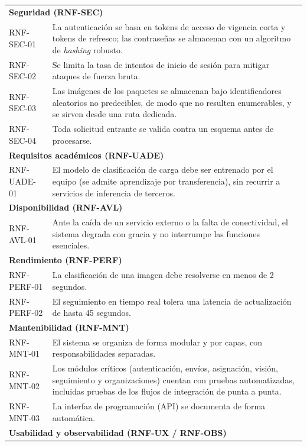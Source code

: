 {\begin{longtable}{p{2.6cm}p{11cm}}
    \multicolumn{2}{l}{\textbf{Seguridad (RNF-SEC)}} \\
    RNF-SEC-01 & La autenticación se basa en tokens de acceso de vigencia corta y tokens de refresco; las contraseñas se almacenan con un algoritmo de \emph{hashing} robusto. \\
    RNF-SEC-02 & Se limita la tasa de intentos de inicio de sesión para mitigar ataques de fuerza bruta. \\
    RNF-SEC-03 & Las imágenes de los paquetes se almacenan bajo identificadores aleatorios no predecibles, de modo que no resulten enumerables, y se sirven desde una ruta dedicada. \\
    RNF-SEC-04 & Toda solicitud entrante se valida contra un esquema antes de procesarse. \\
    \midrule
    \multicolumn{2}{l}{\textbf{Requisitos académicos (RNF-UADE)}} \\
    RNF-UADE-01 & El modelo de clasificación de carga debe ser entrenado por el equipo (se admite aprendizaje por transferencia), sin recurrir a servicios de inferencia de terceros. \\
    \midrule
    \multicolumn{2}{l}{\textbf{Disponibilidad (RNF-AVL)}} \\
    RNF-AVL-01 & Ante la caída de un servicio externo o la falta de conectividad, el sistema degrada con gracia y no interrumpe las funciones esenciales. \\
    \midrule
    \multicolumn{2}{l}{\textbf{Rendimiento (RNF-PERF)}} \\
    RNF-PERF-01 & La clasificación de una imagen debe resolverse en menos de 2 segundos. \\
    RNF-PERF-02 & El seguimiento en tiempo real tolera una latencia de actualización de hasta 45 segundos. \\
    \midrule
    \multicolumn{2}{l}{\textbf{Mantenibilidad (RNF-MNT)}} \\
    RNF-MNT-01 & El sistema se organiza de forma modular y por capas, con responsabilidades separadas. \\
    RNF-MNT-02 & Los módulos críticos (autenticación, envíos, asignación, visión, seguimiento y organizaciones) cuentan con pruebas automatizadas, incluidas pruebas de los flujos de integración de punta a punta. \\
    RNF-MNT-03 & La interfaz de programación (API) se documenta de forma automática. \\
    \midrule
    \multicolumn{2}{l}{\textbf{Usabilidad y observabilidad (RNF-UX / RNF-OBS)}} \\

\end{longtable}}
